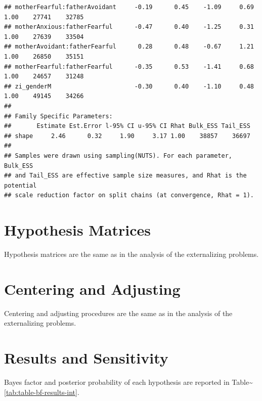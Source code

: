\documentclass[
]{book}
\begin{document}
\begin{verbatim}
## motherFearful:fatherAvoidant     -0.19      0.45    -1.09     0.69 1.00    27741    32785
## motherAnxious:fatherFearful      -0.47      0.40    -1.25     0.31 1.00    27639    33504
## motherAvoidant:fatherFearful      0.28      0.48    -0.67     1.21 1.00    26850    35151
## motherFearful:fatherFearful      -0.35      0.53    -1.41     0.68 1.00    24657    31248
## zi_genderM                       -0.30      0.40    -1.10     0.48 1.00    49145    34266
## 
## Family Specific Parameters: 
##       Estimate Est.Error l-95% CI u-95% CI Rhat Bulk_ESS Tail_ESS
## shape     2.46      0.32     1.90     3.17 1.00    38857    36697
## 
## Samples were drawn using sampling(NUTS). For each parameter, Bulk_ESS
## and Tail_ESS are effective sample size measures, and Rhat is the potential
## scale reduction factor on split chains (at convergence, Rhat = 1).
\end{verbatim}

\hypertarget{hypothesis-matrices-1}{%
\section{Hypothesis Matrices}\label{hypothesis-matrices-1}}

Hypothesis matrices are the same as in the analysis of the externalizing problems.

\hypertarget{centering-and-adjusting-1}{%
\section{Centering and Adjusting}\label{centering-and-adjusting-1}}

Centering and adjusting procedures are the same as in the analysis of the externalizing problems.

\hypertarget{results-and-sensitivity-1}{%
\section{Results and Sensitivity}\label{results-and-sensitivity-1}}

Bayes factor and posterior probability of each hypothesis are reported in Table\textasciitilde\ref{tab:table-bf-results-int}.
\end{document}
